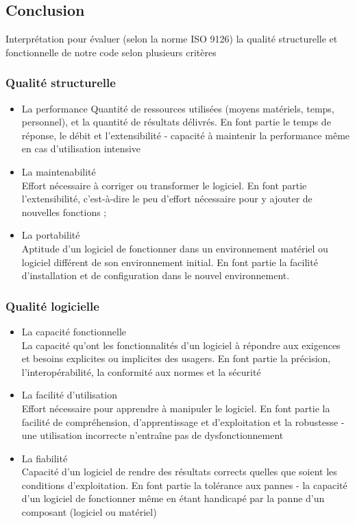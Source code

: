 \documentclass[10pt,a4paper]{article}
\begin{document}
\subsection*{Conclusion}
Interprétation pour évaluer (selon la norme ISO 9126) la qualité structurelle et fonctionnelle  de notre code selon plusieurs critères

\subsubsection*{Qualité structurelle}
\begin{itemize}
\item La performance
Quantité de ressources utilisées (moyens matériels, temps, personnel), et la quantité de résultats délivrés. En font partie le temps de réponse, le débit et l'extensibilité - capacité à maintenir la performance même en cas d'utilisation intensive

\item La maintenabilité\\
Effort nécessaire à corriger ou transformer le logiciel. En font partie l'extensibilité, c'est-à-dire le peu d'effort nécessaire pour y ajouter de nouvelles fonctions ;

\item La portabilité\\
Aptitude d'un logiciel de fonctionner dans un environnement matériel ou logiciel différent de son environnement initial. En font partie la facilité d'installation et de configuration dans le nouvel environnement.
\end{itemize}

\subsubsection*{Qualité logicielle}
\begin{itemize}
\item La capacité fonctionnelle\\
La capacité qu'ont les fonctionnalités d'un logiciel à répondre aux exigences et besoins explicites ou implicites des usagers. En font partie la précision, l'interopérabilité, la conformité aux normes et la sécurité 

\item La facilité d'utilisation\\
Effort nécessaire pour apprendre à manipuler le logiciel. En font partie la facilité de compréhension, d'apprentissage et d'exploitation et la robustesse - une utilisation incorrecte n'entraîne pas de dysfonctionnement 

\item La fiabilité\\
Capacité d'un logiciel de rendre des résultats corrects quelles que soient les conditions d'exploitation. En font partie la tolérance aux pannes - la capacité d'un logiciel de fonctionner même en étant handicapé par la panne d'un composant (logiciel ou matériel) 
\end{itemize}
\end{document}
